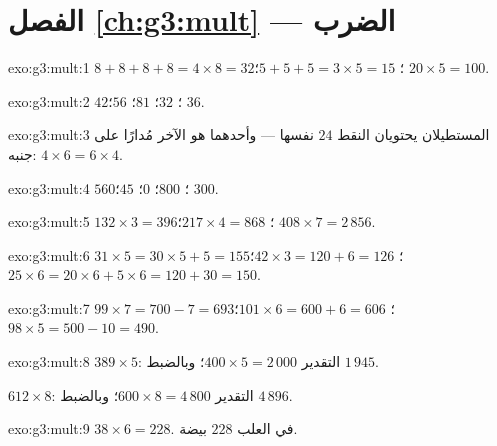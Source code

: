 \section*{الفصل \ref{ch:g3:mult} --- الضرب}

\begin{solution}{exo:g3:mult:1}
$8 + 8 + 8 + 8 = 4 \times 8 = 32$؛ \quad
$5 + 5 + 5 = 3 \times 5 = 15$؛ \quad
$20 \times 5 = 100$.
\end{solution}

\begin{solution}{exo:g3:mult:2}
$42$؛ \quad $32$؛ \quad $81$؛ \quad $56$؛ \quad $36$.
\end{solution}

\begin{solution}{exo:g3:mult:3}
المستطيلان يحتويان النقط $24$ نفسها --- وأحدهما هو الآخر
مُدارًا على جنبه: $4 \times 6 = 6 \times 4$.
\end{solution}

\begin{solution}{exo:g3:mult:4}
$560$؛ \quad $800$؛ \quad $0$؛ \quad $45$؛ \quad $300$.
\end{solution}

\begin{solution}{exo:g3:mult:5}
$132 \times 3 = 396$؛ \quad
$217 \times 4 = 868$؛ \quad
$408 \times 7 = 2\,856$.
\end{solution}

\begin{solution}{exo:g3:mult:6}
$31 \times 5 = 30 \times 5 + 5 = 155$؛ \quad
$42 \times 3 = 120 + 6 = 126$؛ \quad
$25 \times 6 = 20 \times 6 + 5 \times 6 = 120 + 30 = 150$.
\end{solution}

\begin{solution}{exo:g3:mult:7}
$99 \times 7 = 700 - 7 = 693$؛ \quad
$101 \times 6 = 600 + 6 = 606$؛ \quad
$98 \times 5 = 500 - 10 = 490$.
\end{solution}

\begin{solution}{exo:g3:mult:8}
$389 \times 5$: التقدير $400 \times 5 = 2\,000$؛ وبالضبط
$1\,945$.

$612 \times 8$: التقدير $600 \times 8 = 4\,800$؛ وبالضبط $4\,896$.
\end{solution}

\begin{solution}{exo:g3:mult:9}
$38 \times 6 = 228$. في العلب $228$ بيضة.
\end{solution}

